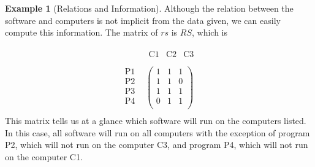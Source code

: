 \documentclass[10pt,]{book}
\theoremstyle{plain}
\theoremstyle{definition}
\theoremstyle{definition}
\theoremstyle{definition}
\newtheorem{example}[theorem]{Example}
\theoremstyle{definition}
\begin{document}
\begin{example}[Relations and Information]
Although the relation between the software and computers is not implicit from the data given, we can easily compute this information. The matrix of \(rs\) is \(RS\), which is

 \begin{equation*}\begin{array}{cc}
   & 
\begin{array}{ccc}
 \text{C1} & \text{C2} & \text{C3} \\
\end{array}
 \\
 
\begin{array}{c}
 \text{P1} \\
 \text{P2} \\
 \text{P3} \\
 \text{P4} \\
\end{array}
 & \left(
\begin{array}{ccc}
  1  &  1  & 1 \\
 1 &  1  & 0 \\
 1 & 1 &  1  \\
 0 &  1  &  1  \\
\end{array}
\right) \\
\end{array}\end{equation*}
This matrix tells us at a glance which software will run on the computers listed. In this case, all software will run on all computers with the exception of program P2, which will not run on the computer C3, and program P4, which will not run on the computer C1.%
\end{example}
\typeout{************************************************}
\typeout{************************************************}
\end{document}
